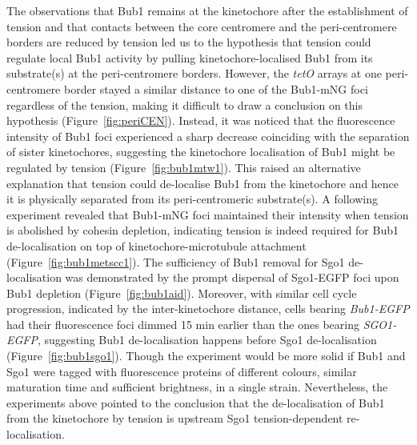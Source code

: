 The observations that Bub1 remains at the kinetochore after the establishment of tension \citep{Bokros2021YeastAnaphase, Nerusheva2014} and that contacts between the core centromere and the peri-centromere borders are reduced by tension \citep{Paldi2020ConvergentPericentromeres} led us to the hypothesis that tension could regulate local Bub1 activity by pulling kinetochore-localised Bub1 from its substrate(s) at the peri-centromere borders. However, the \textit{tetO} arrays at one peri-centromere border stayed a similar distance to one of the Bub1-mNG foci regardless of the tension, making it difficult to draw a conclusion on this hypothesis (Figure~\ref{fig:periCEN}). Instead, it was noticed that the fluorescence intensity of Bub1 foci experienced a sharp decrease coinciding with the separation of sister kinetochores, suggesting the kinetochore localisation of Bub1 might be regulated by tension (Figure~\ref{fig:bub1mtw1}). This raised an alternative explanation that tension could de-localise Bub1 from the kinetochore and hence it is physically separated from its peri-centromeric substrate(s). A following experiment revealed that Bub1-mNG foci maintained their intensity when tension is abolished by cohesin depletion, indicating tension is indeed required for Bub1 de-localisation on top of kinetochore-microtubule attachment (Figure~\ref{fig:bub1metscc1}). The sufficiency of Bub1 removal for Sgo1 de-localisation was demonstrated by the prompt dispersal of Sgo1-EGFP foci upon Bub1 depletion (Figure~\ref{fig:bub1aid}). Moreover, with similar cell cycle progression, indicated by the inter-kinetochore distance, cells bearing \textit{Bub1-EGFP} had their fluorescence foci dimmed 15 \si{\minute} earlier than the ones bearing \textit{SGO1-EGFP}, suggesting Bub1 de-localisation happens before Sgo1 de-localisation (Figure~\ref{fig:bub1sgo1}). Though the experiment would be more solid if Bub1 and Sgo1 were tagged with fluorescence proteins of different colours, similar maturation time and sufficient brightness, in a single strain. Nevertheless, the experiments above pointed to the conclusion that the de-localisation of Bub1 from the kinetochore by tension is upstream Sgo1 tension-dependent re-localisation. 

